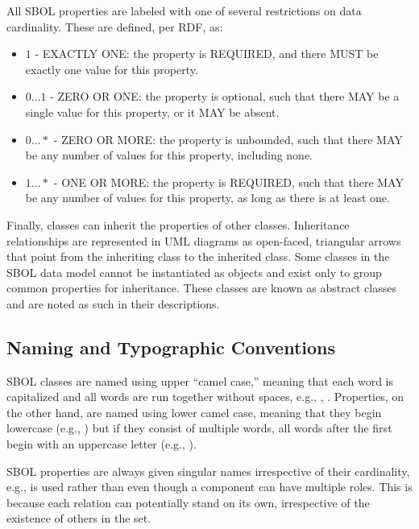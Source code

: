 All SBOL properties are labeled with one of several restrictions on data cardinality. These are defined, per RDF, as:

\begin{itemize}

\item $1$ - EXACTLY ONE: the property is REQUIRED, and there MUST be exactly one value for this property.

\item $0 \ldots 1$ - ZERO OR ONE: the property is optional, such that there MAY be a single value for this property, or it MAY be absent.

\item $0 \ldots *$ - ZERO OR MORE: the property is unbounded, such that there MAY be any number of values for this property, including none.

\item $1 \ldots *$ - ONE OR MORE: the property is REQUIRED, such that there MAY be any number of values for this property, as long as there is at least one.

\end{itemize}

Finally, classes can inherit the properties of other classes. Inheritance relationships are represented in UML diagrams as open-faced, triangular arrows that point from the inheriting class to the inherited class. Some classes in the SBOL data model cannot be instantiated as objects and exist only to group common properties for inheritance.
These classes are known as abstract classes and are noted as such in their descriptions.

\subsection{Naming and Typographic Conventions}
\label{sec:nameconventions}

SBOL classes are named using upper ``camel case,'' meaning that each word is capitalized and all words are run together without spaces, e.g., , .
Properties, on the other hand, are named using lower camel case, meaning that they begin lowercase (e.g., ) but if they consist of multiple words, all words after the first begin with an uppercase letter (e.g., ).

SBOL properties are always given singular names irrespective of their cardinality, e.g.,  is used rather than  even though a component can have multiple roles.
This is because each relation can potentially stand on its own, irrespective of the existence of others in the set.

